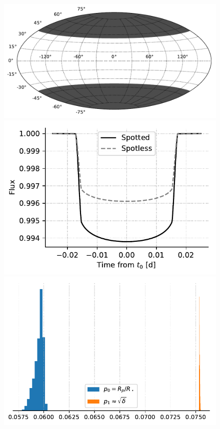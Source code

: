 \begin{subappendices}
\begin{figure}
    \centering
    \includegraphics[scale=0.5]{spot_map_3.pdf}
    \includegraphics[scale=0.6]{transit_quad_3.pdf}
    \includegraphics[scale=0.7]{rms3_agreement.pdf}

\end{figure}
\end{subappendices}
